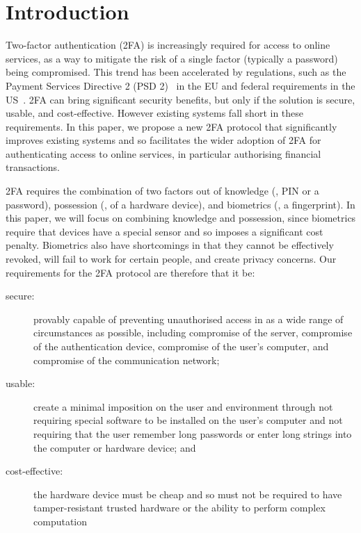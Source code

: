 


\section{Introduction}

Two-factor authentication (2FA) is increasingly required for access to online services, as a way to mitigate the risk of a single factor (typically a password) being compromised.
This trend has been accelerated by regulations, such as the Payment Services Directive 2 (PSD 2)~\cite{psd2} in the EU and federal requirements in the US~\cite{Zero-Trust-Cybersecurity}.
2FA can bring significant security benefits, but only if the solution is secure, usable, and cost-effective.
However existing systems fall short in these requirements.
In this paper, we propose a new 2FA protocol that significantly improves existing systems and so facilitates the wider adoption of 2FA for authenticating access to online services, in particular authorising financial transactions.

2FA requires the combination of two factors out of knowledge (\eg, PIN or a password), possession (\eg, of a hardware device), and biometrics (\eg, a fingerprint).
In this paper, we will focus on combining knowledge and possession, since biometrics require that devices have a special sensor and so imposes a significant cost penalty.
Biometrics also have shortcomings in that they cannot be effectively revoked, will fail to work for certain people, and create privacy concerns. Our requirements for the 2FA protocol are therefore that it be:%
\begin{description}
\item[secure:] provably capable of preventing unauthorised access in as a wide range of circumstances as possible, including compromise of the server, compromise of the authentication device, compromise of the user's computer, and compromise of the communication network;
\item[usable:] create a minimal imposition on the user and environment through not requiring special software to be installed on the user's computer and not requiring that the user remember long passwords or enter long strings into the computer or hardware device; and
\item[cost-effective:] the hardware device must be cheap and so must not be required to have tamper-resistant trusted hardware or the ability to perform complex computation
\end{description}

